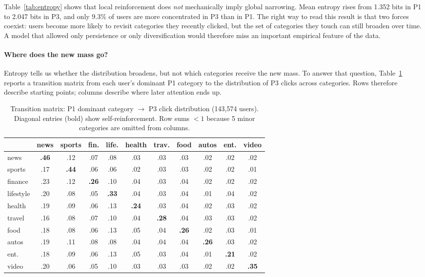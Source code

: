 \documentclass[11pt]{article}
\begin{document}
Table~\ref{tab:entropy} shows that local reinforcement does \emph{not} mechanically imply global narrowing. Mean entropy rises from 1.352 bits in P1 to 2.047 bits in P3, and only 9.3\% of users are more concentrated in P3 than in P1. The right way to read this result is that two forces coexist: users become more likely to revisit categories they recently clicked, but the set of categories they touch can still broaden over time. A model that allowed only persistence or only diversification would therefore miss an important empirical feature of the data.

\paragraph{Where does the new mass go?}
Entropy tells us whether the distribution broadens, but not which categories receive the new mass. To answer that question, Table~\ref{tab:transition} reports a transition matrix from each user's dominant P1 category to the distribution of P3 clicks across categories. Rows therefore describe starting points; columns describe where later attention ends up.

\begin{table}[ht]
\centering
\caption{Transition matrix: P1 dominant category $\to$ P3 click distribution (143,574 users). Diagonal entries (bold) show self-reinforcement. Row sums $< 1$ because 5 minor categories are omitted from columns.}
\label{tab:transition}
\small
\setlength{\tabcolsep}{3.5pt}
\begin{tabular}{l|cccccccccc}
\toprule
& news & sports & fin. & life. & health & trav. & food & autos & ent. & video \\
\midrule
news & \textbf{.46} & .12 & .07 & .08 & .03 & .03 & .03 & .02 & .02 & .02 \\
sports & .17 & \textbf{.44} & .06 & .06 & .02 & .03 & .03 & .02 & .02 & .01 \\
finance & .23 & .12 & \textbf{.26} & .10 & .04 & .03 & .04 & .02 & .02 & .02 \\
lifestyle & .20 & .08 & .05 & \textbf{.33} & .04 & .03 & .04 & .01 & .04 & .02 \\
health & .19 & .09 & .06 & .13 & \textbf{.24} & .03 & .04 & .02 & .03 & .02 \\
travel & .16 & .08 & .07 & .10 & .04 & \textbf{.28} & .04 & .03 & .03 & .02 \\
food & .18 & .08 & .06 & .13 & .05 & .04 & \textbf{.26} & .02 & .03 & .01 \\
autos & .19 & .11 & .08 & .08 & .04 & .04 & .04 & \textbf{.26} & .03 & .02 \\
ent. & .18 & .09 & .06 & .13 & .05 & .03 & .04 & .01 & \textbf{.21} & .02 \\
video & .20 & .06 & .05 & .10 & .03 & .03 & .03 & .02 & .02 & \textbf{.35} \\
\bottomrule
\end{tabular}
\end{table}
\FloatBarrier
\end{document}
